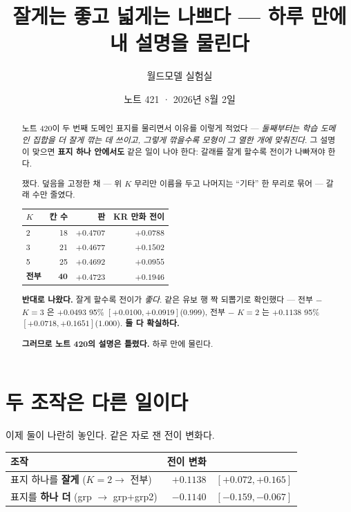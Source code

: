 \documentclass[11pt]{article}
\begin{document}
\title{잘게는 좋고 넓게는 나쁘다 --- 하루 만에 내 설명을 물린다}
\author{월드모델 실험실}
\date{노트 421 · 2026년 8월 2일}
\maketitle

\begin{abstract}
노트 420이 두 번째 도메인 표지를 물리면서 이유를 이렇게 적었다 ---
\emph{둘째부터는 학습 도메인 집합을 더 잘게 깎는 데 쓰이고, 그렇게 깎을수록
모형이 그 열한 개에 맞춰진다.} 그 설명이 맞으면 \textbf{표지 하나 안에서도}
같은 일이 나야 한다: 갈래를 잘게 할수록 전이가 나빠져야 한다.

쟀다. 덮음을 고정한 채 --- 위 $K$ 무리만 이름을 두고 나머지는 ``기타'' 한
무리로 묶어 --- 갈래 수만 줄였다.

\begin{center}
\begin{tabular}{lrrr}
\hline
$K$ & 칸 수 & 판 & KR 만화 전이 \\
\hline
2 & 18 & $+0.4707$ & $+0.0788$ \\
3 & 21 & $+0.4677$ & $+0.1502$ \\
5 & 25 & $+0.4692$ & $+0.0955$ \\
\textbf{전부} & \textbf{40} & $\mathbf{+0.4723}$ & $\mathbf{+0.1946}$ \\
\hline
\end{tabular}
\end{center}

\textbf{반대로 나왔다.} 잘게 할수록 전이가 \emph{좋다}. 같은 유보 행 짝
되뽑기로 확인했다 --- 전부 $-$ $K{=}3$ 은 $+0.0493$ 95\%
$[+0.0100, +0.0919]$($0.999$), 전부 $-$ $K{=}2$ 는 $+0.1138$ 95\%
$[+0.0718, +0.1651]$($1.000$). \textbf{둘 다 확실하다.}

\textbf{그러므로 노트 420의 설명은 틀렸다.} 하루 만에 물린다.
\end{abstract}

\section{두 조작은 다른 일이다}

이제 둘이 나란히 놓인다. 같은 자로 잰 전이 변화다.

\begin{center}
\begin{tabular}{lrl}
\hline
조작 & 전이 변화 & \\
\hline
표지 하나를 \textbf{잘게} ($K{=}2 \to$ 전부) & $\mathbf{+0.1138}$ & $[+0.072, +0.165]$ \\
표지를 \textbf{하나 더} (grp $\to$ grp$+$grp2) & $\mathbf{-0.1140}$ & $[-0.159, -0.067]$ \\
\hline
\end{tabular}
\end{center}
\end{document}
